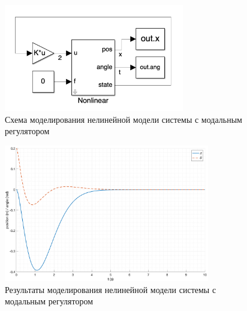 \begin{figure}[ht!]
    \centering
    \includegraphics[width=0.7\textwidth]{media/modal_control_scheme.png}
    \caption{Схема моделирования нелинейной модели системы с модальным регулятором}
    \label{fig:modal_control_scheme_nonlinear}
\end{figure}
\begin{figure}[ht!]
    \centering
    \includegraphics[width=0.8\textwidth]{media/plots/modal_control/out_0.png}
    \caption{Результаты моделирования нелинейной модели системы с модальным регулятором}
    \label{fig:modal_control_nonlinear_out}
\end{figure}

